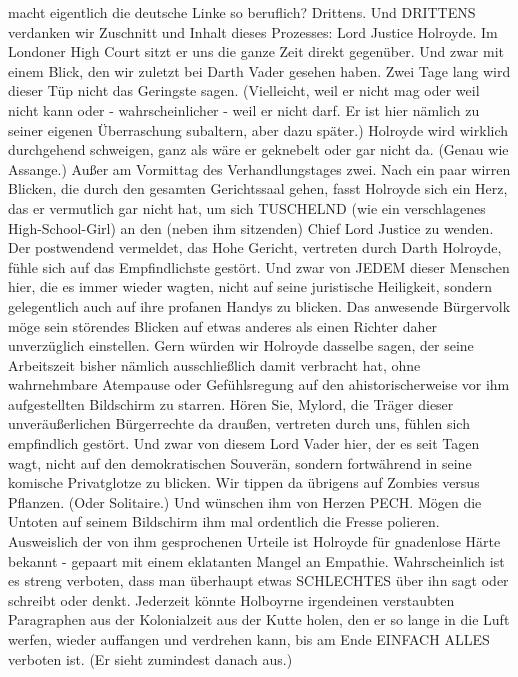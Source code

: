 \begin{multicols}{2}
{macht eigentlich die deutsche Linke so beruflich?\textCR
Drittens.\textCR
Und DRITTENS verdanken wir Zuschnitt und Inhalt dieses Prozesses: Lord Justice Holroyde. Im Londoner High
Court sitzt er uns die ganze Zeit direkt gegenüber. Und
zwar mit einem Blick, den wir zuletzt bei Darth Vader gesehen haben. Zwei Tage lang wird dieser Tüp nicht das
Geringste sagen. (Vielleicht, weil er nicht mag oder weil
nicht kann oder - wahrscheinlicher - weil er nicht darf.
Er ist hier nämlich zu seiner eigenen Überraschung subaltern, aber dazu später.)\textCR
Holroyde wird wirklich durchgehend schweigen, ganz
als wäre er geknebelt oder gar nicht da. (Genau wie Assange.) Außer am Vormittag des Verhandlungstages zwei.
Nach ein paar wirren Blicken, die durch den gesamten
Gerichtssaal gehen, fasst Holroyde sich ein Herz, das er
vermutlich gar nicht hat, um sich TUSCHELND (wie ein
verschlagenes High-School-Girl) an den (neben ihm sitzenden) Chief Lord Justice zu wenden.\textCR
Der postwendend vermeldet, das Hohe Gericht, vertreten durch Darth Holroyde, fühle sich auf das Empfindlichste gestört. Und zwar von JEDEM dieser Menschen
hier, die es immer wieder wagten, nicht auf seine juristische Heiligkeit, sondern gelegentlich auch auf ihre
profanen Handys zu blicken. Das anwesende Bürgervolk
möge sein störendes Blicken auf etwas anderes als einen
Richter daher unverzüglich einstellen.\textCR
Gern würden wir Holroyde dasselbe sagen, der seine Arbeitszeit bisher nämlich ausschließlich damit verbracht
hat, ohne wahrnehmbare Atempause oder Gefühlsregung auf den ahistorischerweise vor ihm aufgestellten
Bildschirm zu starren. Hören Sie, Mylord, die Träger
dieser unveräußerlichen Bürgerrechte da draußen, vertreten durch uns, fühlen sich empfindlich gestört. Und
zwar von diesem Lord Vader hier, der es seit Tagen wagt,
nicht auf den demokratischen Souverän, sondern fortwährend in seine komische Privatglotze zu blicken.\textCR
Wir tippen da übrigens auf Zombies versus Pflanzen.
(Oder Solitaire.) Und wünschen ihm von Herzen PECH.
Mögen die Untoten auf seinem Bildschirm ihm mal ordentlich die Fresse polieren.\textCR
Ausweislich der von ihm gesprochenen Urteile ist Holroyde für gnadenlose Härte bekannt - gepaart mit einem
eklatanten Mangel an Empathie. Wahrscheinlich ist es
streng verboten, dass man überhaupt etwas SCHLECHTES über ihn sagt oder schreibt oder denkt. Jederzeit
könnte Holboyrne irgendeinen verstaubten Paragraphen aus der Kolonialzeit aus der Kutte holen, den er so
lange in die Luft werfen, wieder auffangen und verdrehen kann, bis am Ende EINFACH ALLES verboten ist. (Er
sieht zumindest danach aus.)\textCR
}
\end{multicols}
